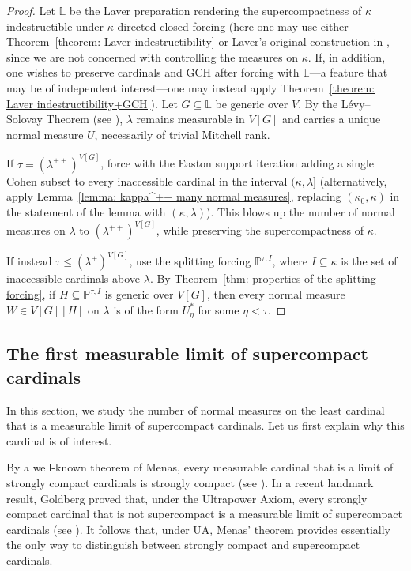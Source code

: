 \documentclass[11pt]{amsart}
\theoremstyle{definition}
\theoremstyle{remark}
\newcommand\<{{<}}
\begin{document}
\begin{proof}
    Let $\mathbb{L}$ be the Laver preparation rendering the supercompactness of $\kappa$ indestructible under $\kappa$-directed closed forcing (here one may use either Theorem~\ref{theorem: Laver indestructibility} or Laver’s original construction in \cite{Lav}, since we are not concerned with controlling the measures on $\kappa$. If, in addition, one wishes to preserve cardinals and GCH after forcing with $\mathbb{L}$—a feature that may be of independent interest—one may instead apply Theorem~\ref{theorem: Laver indestructibility+GCH}). Let $G\subseteq \mathbb{L}$ be generic over $V$. By the L\'evy–Solovay Theorem (see \cite{levysolovay1967}), $\lambda$ remains measurable in $V[G]$ and carries a unique normal measure $U$, necessarily of trivial Mitchell rank.

If $\tau=(\lambda^{++})^{V[G]}$, force with the Easton support iteration adding a single Cohen subset to every inaccessible cardinal in the interval $(\kappa,\lambda]$ (alternatively, apply Lemma~\ref{lemma: kappa^++ many normal measures}, replacing $(\kappa_0,\kappa)$ in the statement of the lemma with $(\kappa,\lambda)$). This blows up the number of normal measures on $\lambda$ to $(\lambda^{++})^{V[G]}$, while preserving the supercompactness of $\kappa$.

If instead $\tau\leq (\lambda^{+})^{V[G]}$, use the splitting forcing $\mathbb{P}^{\tau,I}$, where $I\subseteq \kappa$ is the set of inaccessible cardinals above $\lambda$. By Theorem~\ref{thm: properties of the splitting forcing}, if $H\subseteq \mathbb{P}^{\tau,I}$ is generic over $V[G]$, then every normal measure $W\in V[G][H]$ on $\lambda$ is of the form $U^*_\eta$ for some $\eta<\tau$.
\end{proof}



\subsection{The first measurable limit of supercompact cardinals}

In this section, we study the number of normal measures on the least cardinal that is a measurable limit of supercompact cardinals. Let us first explain why this cardinal is of interest.

By a well-known theorem of Menas, every measurable cardinal that is a limit of strongly compact cardinals is strongly compact (see \cite[Theorem 2.21]{menas1974strong}). In a recent landmark result, Goldberg proved that, under the Ultrapower Axiom, every strongly compact cardinal that is not supercompact is a measurable limit of supercompact cardinals (see \cite[Theorem 8.3.10]{goldbergtheultrapoweraxiom}). It follows that, under UA, Menas’ theorem provides essentially the only way to distinguish between strongly compact and supercompact cardinals.
\end{document}
